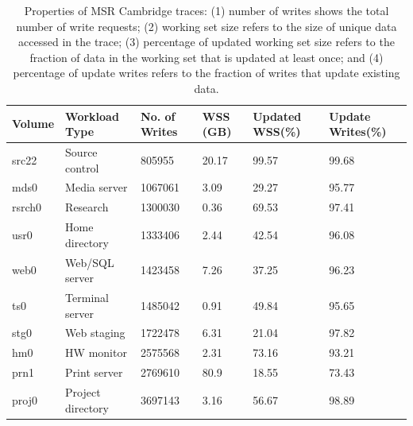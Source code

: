\setlength{\tabcolsep}{3pt}
\begin{table}[!t]  \footnotesize
\centering
    \begin{tabular}{C{0.71cm}C{1.9cm}C{1cm}C{0.7cm}C{1.1cm}C{1.3cm}}
    \toprule
           Volume    & Workload \newline Type        & \hfill No. of \newline \hfill Writes & \hfill WSS \newline \hfill (GB) 
           & Updated \newline WSS(\%) & Update \newline Writes(\%) \\
    \midrule
         \raggedright src22   & \raggedright Source control  & \hfill 805955        & \hfill 20.17    & 99.57            &  99.68 \\
         \raggedright mds0    & \raggedright Media server      & \hfill 1067061       & \hfill 3.09     & 29.27            &  95.77 \\
         \raggedright rsrch0  & \raggedright Research        & \hfill 1300030       & \hfill 0.36     & 69.53            &  97.41 \\
         \raggedright usr0    & \raggedright Home directory       & \hfill 1333406       & \hfill 2.44     & 42.54            &  96.08 \\
         \raggedright web0    & \raggedright Web/SQL server    & \hfill 1423458       & \hfill 7.26     & 37.25            &  96.23 \\
         \raggedright ts0     & \raggedright Terminal server   & \hfill 1485042       & \hfill 0.91     & 49.84            &  95.65 \\
         \raggedright stg0    & \raggedright Web staging     & \hfill 1722478       & \hfill 6.31     & 21.04            &  97.82 \\
         \raggedright hm0     & \raggedright HW monitor      & \hfill 2575568       & \hfill 2.31     & 73.16            &  93.21 \\
         \raggedright prn1    & \raggedright Print server      & \hfill 2769610       & \hfill 80.9     & 18.55            &  73.43 \\
         \raggedright proj0   & \raggedright Project directory    & \hfill 3697143       & \hfill 3.16     & 56.67            &  98.89 \\
    \bottomrule
    \end{tabular}%
    \vspace*{3pt}\\
	\caption{Properties of MSR Cambridge traces: (1) number of writes
		shows the total number of write requests; (2) working set size refers to
		the size of unique data accessed in the trace; 
		(3) percentage of updated working set
		size refers to the fraction of data in the working set that is updated
		at least once; and (4) percentage of update writes refers to the
		fraction of writes that update existing data.}
\label{table:msr}
\end{table}


